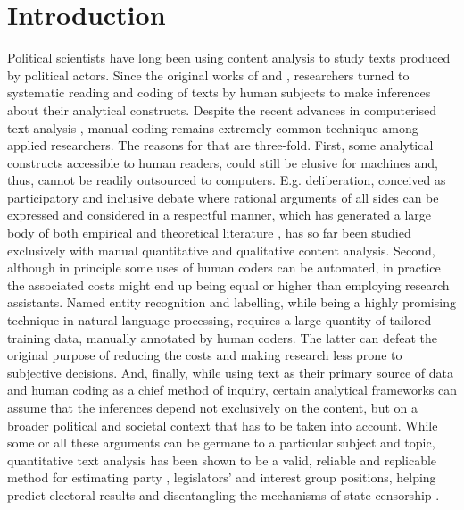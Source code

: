 \documentclass[a4paper, 12pt]{article}
\begin{document}
\clearpage
\doublespacing

\section{Introduction}

Political scientists have long been using content analysis to study texts produced by political actors. Since the original works of \citet{Berelson1948} and \citet{Lasswell1949}, researchers turned to systematic reading and coding of texts by human subjects to make inferences about their analytical constructs. Despite the recent advances in computerised text analysis \citep{Grimmer2013}, manual coding remains extremely common technique among applied researchers. The reasons for that are three-fold. First, some analytical constructs accessible to human readers, could still be elusive for machines and, thus, cannot be readily outsourced to computers. E.g. deliberation, conceived as participatory and inclusive debate where rational arguments of all sides can be expressed and considered in a respectful manner, which has generated a large body of both empirical \citep{Fishkin2005, Steenbergen2003} and theoretical literature \citep{Dryzek2004, Gutmann2004}, has so far been studied exclusively with manual quantitative and qualitative content analysis. Second, although in principle some uses of human coders can be automated, in practice the associated costs might end up being equal or higher than employing research assistants. Named entity recognition and labelling, while being a highly promising technique in natural language processing, requires a large quantity of tailored training data, manually annotated by human coders. The latter can defeat the original purpose of reducing the costs and making research less prone to subjective decisions. And, finally, while using text as their primary source of data and human coding as a chief method of inquiry, certain analytical frameworks can assume that the inferences depend not exclusively on the content, but on a broader political and societal context that has to be taken into account. While some or all these arguments can be germane to a particular subject and topic, quantitative text analysis has been shown to be a valid, reliable and replicable method for estimating party \citep{Laver2003, Slapin2008}, legislators' \citep{Lauderdale2016} and interest group \citep{Kluver2009} positions, helping predict electoral results \citep{Beauchamp2017} and disentangling the mechanisms of state censorship \citep{King2013}.
\end{document}
